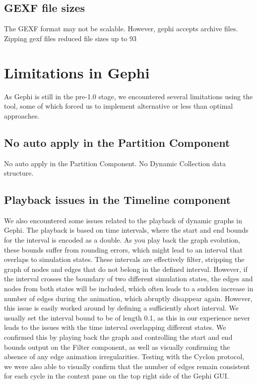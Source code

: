 \subsection{GEXF file sizes}
The GEXF format may not be scalable. However, gephi accepts
archive files. Zipping gexf files reduced file sizes up to 93%

\section{Limitations in Gephi}

As Gephi is still in the pre-1.0 stage, we encountered several
limitations using the tool, some of which forced us to implement
alternative or less than optimal approaches.

\subsection{No auto apply in the Partition Component}
No auto apply in the Partition Component. No Dynamic Collection data
structure.

\subsection{Playback issues in the Timeline component}

We also encountered some issues related to the playback of dynamic
graphs in Gephi. The playback is based on time intervals, where the
start and end bounds for the interval is encoded as a double. As you
play back the graph evolution, these bounds suffer from rounding errors,
which might lead to an interval that overlaps to simulation states.
These intervals are effectively filter, stripping the graph of nodes and
edges that do not belong in the defined interval. However, if the
interval crosses the boundary of two different simulation states, the
edges and nodes from both states will be included, which often leads to
a sudden increase in number of edges during the animation, which
abruptly disappear again. However, this issue is easily worked around by
defining a sufficiently short interval. We usually set the interval
bound to be of length 0.1, as this in our experience never leads to the
issues with the time interval overlapping different states. We confirmed
this by playing back the graph and controlling the start and end bounds
output on the Filter component, as well as visually confirming the
absence of any edge animation irregularities. Testing with the Cyclon
protocol, we were also able to visually confirm that the number of edges
remain consistent for each cycle in the context pane on the top right
side of the Gephi GUI\@.


